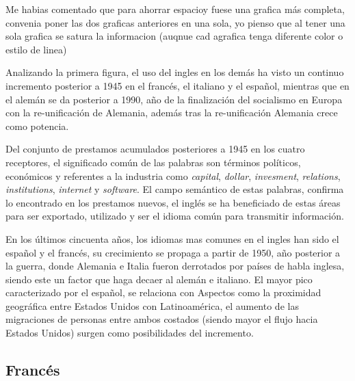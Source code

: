 \begin{tcolorbox}
	[colback=red!5!white,colframe=red!75!black]
	Me habias comentado que para ahorrar espacioy fuese una grafica más completa, convenia poner las dos graficas anteriores en una sola, yo pienso que al tener una sola grafica se satura la informacion (auqnue cad agrafica tenga diferente color o estilo de linea)
\end{tcolorbox}


Analizando la primera figura, el uso del ingles en los demás ha visto un continuo incremento posterior a 1945 en el francés, el italiano y el español, mientras que en el alemán se da posterior a 1990, año de la finalización del socialismo en Europa con la re-unificación de Alemania, además tras la re-unificación Alemania crece como potencia. 

Del conjunto de prestamos acumulados posteriores a 1945 en los cuatro receptores, el significado común de las palabras son términos políticos, económicos y referentes a la industria como  \textit{capital}, \textit{dollar}, \textit{invesment}, \textit{relations}, \textit{institutions}, \textit{internet} y \textit{software}. El campo semántico de estas palabras, confirma lo encontrado en los prestamos nuevos,  el inglés se ha beneficiado de estas áreas para ser exportado, utilizado y ser el idioma común para transmitir información. 


En los últimos cincuenta años, los idiomas mas comunes en el ingles han sido el español y el francés,  su crecimiento se propaga a partir de  1950, año posterior a la guerra, donde Alemania e Italia fueron derrotados por países de habla inglesa, siendo este un factor que haga decaer al alemán e italiano. El mayor pico  caracterizado por el español,  se relaciona con Aspectos como la proximidad geográfica entre Estados Unidos con Latinoamérica,  el aumento de las migraciones de personas entre ambos costados (siendo mayor el flujo hacia Estados Unidos) surgen como posibilidades del incremento.


\newpage
\subsection{Francés}

